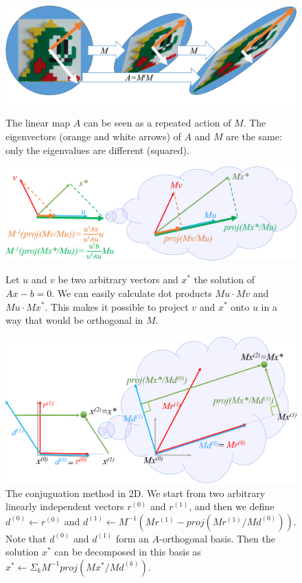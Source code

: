 \documentclass[notitlepage,oneside]{book}
\begin{document}
\begin{figure}[p]
\centering
  \includegraphics[width=1\linewidth]{img/cg/MMA.png}
  \caption{
The linear map $A$ can be seen as a repeated action of $M$.
The eigenvectors (orange and white arrows) of $A$ and $M$ are the same: only the eigenvalues are different (squared).}
  \label{fig:stretchM}

  \includegraphics[width=.8\linewidth]{img/cg/Aorth.png}
  \caption{Let $u$ and $v$ be two arbitrary vectors and $x^*$ the solution of $Ax-b=0$.
  We can easily calculate dot products $Mu\cdot Mv$ and $Mu\cdot Mx^*$.
  This makes it possible to project $v$ and $x^*$ onto $u$ in a way that would be orthogonal in $M$.}
  \label{fig:Aorth}

  \includegraphics[width=.7\linewidth]{img/cg/proj2D.png}
  \caption{The conjuguation method in 2D. We start from two arbitrary linearly independent vectors $r^{(0)}$ and $r^{(1)}$, and then we define $d^{(0)} \leftarrow r^{(0)}$
    and $d^{(1)} \leftarrow M^{-1}\left(Mr^{(1)}-proj\left(Mr^{(1)}/Md^{(0)}\right)\right)$. 
    Note that $d^{(0)}$ and $d^{(1)}$ form an $A$-orthogonal basis.
    Then the solution $x^*$ can be decomposed in this basis as
    $x^*\leftarrow \Sigma_k M^{-1}proj\left(Mx^*/Md^{(k)}\right)$.}
  \label{fig:proj2D}

\end{figure}
\end{document}
